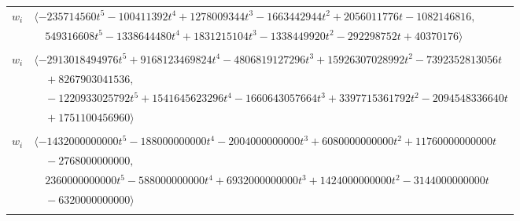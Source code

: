 \documentclass[11pt]{article}
\begin{document}
\begin{longtable}{@{}ll@{}}
$w_i$ & $\langle -235714560t^{5}-100411392t^{4}+1278009344t^{3}-1663442944t^{2}+2056011776t-1082146816,$\\
 & $\quad 549316608t^{5}-1338644480t^{4}+1831215104t^{3}-1338449920t^{2}-292298752t+40370176\rangle$\\
\addlinespace[2pt]
\multicolumn{2}{@{}p{0.97\textwidth}@{}}{$i=36$, $D_i=60466176$, $\rho_{ij}$: $5{:}2, \allowbreak 10{:}3, \allowbreak 16{:}1, \allowbreak 20{:}3, \allowbreak 24{:}3, \allowbreak 26{:}2, \allowbreak 33{:}2, \allowbreak 37{:}1, \allowbreak 45{:}1, \allowbreak 46{:}3, \allowbreak 48{:}3, \allowbreak 49{:}2, \allowbreak 53{:}3, \allowbreak 57{:}3, \allowbreak 59{:}2, \allowbreak 61{:}1, \allowbreak 62{:}3, \allowbreak 64{:}3, \allowbreak 65{:}1, \allowbreak 66{:}1, \allowbreak 68{:}1, \allowbreak 69{:}1, \allowbreak 73{:}1, \allowbreak 79{:}2$}\\
$w_i$ & $\langle -2913018494976t^{5}+9168123469824t^{4}-4806819127296t^{3}+15926307028992t^{2}-7392352813056t$\\
 & $\quad +8267903041536,$\\
 & $\quad -1220933025792t^{5}+1541645623296t^{4}-1660643057664t^{3}+3397715361792t^{2}-2094548336640t$\\
 & $\quad +1751100456960\rangle$\\
\addlinespace[2pt]
\multicolumn{2}{@{}p{0.97\textwidth}@{}}{$i=37$, $D_i=500000000$, $\rho_{ij}$: $1{:}2, \allowbreak 9{:}1, \allowbreak 16{:}1, \allowbreak 23{:}3, \allowbreak 24{:}2, \allowbreak 31{:}2, \allowbreak 35{:}2, \allowbreak 36{:}3, \allowbreak 42{:}1, \allowbreak 45{:}1, \allowbreak 47{:}2, \allowbreak 49{:}3, \allowbreak 50{:}2, \allowbreak 53{:}2, \allowbreak 62{:}3, \allowbreak 64{:}2, \allowbreak 66{:}3, \allowbreak 76{:}3, \allowbreak 78{:}2$}\\
$w_i$ & $\langle -1432000000000t^{5}-188000000000t^{4}-2004000000000t^{3}+6080000000000t^{2}+11760000000000t$\\
 & $\quad -2768000000000,$\\
 & $\quad 2360000000000t^{5}-588000000000t^{4}+6932000000000t^{3}+1424000000000t^{2}-3144000000000t$\\
 & $\quad -6320000000000\rangle$\\
\addlinespace[2pt]
\multicolumn{2}{@{}p{0.97\textwidth}@{}}{$i=38$, $D_i=4096$, $\rho_{ij}$: $2{:}2, \allowbreak 3{:}1, \allowbreak 4{:}2, \allowbreak 7{:}3, \allowbreak 9{:}2, \allowbreak 12{:}1, \allowbreak 20{:}3, \allowbreak 27{:}3, \allowbreak 32{:}2, \allowbreak 34{:}3, \allowbreak 44{:}3, \allowbreak 48{:}1, \allowbreak 49{:}1, \allowbreak 51{:}2, \allowbreak 54{:}2, \allowbreak 56{:}3, \allowbreak 60{:}2, \allowbreak 63{:}1, \allowbreak 64{:}2, \allowbreak 65{:}2, \allowbreak 66{:}2, \allowbreak 67{:}1, \allowbreak 74{:}3, \allowbreak 75{:}3, \allowbreak 79{:}1, \allowbreak 80{:}1, \allowbreak 81{:}2$}\\

\end{longtable}
\end{document}
